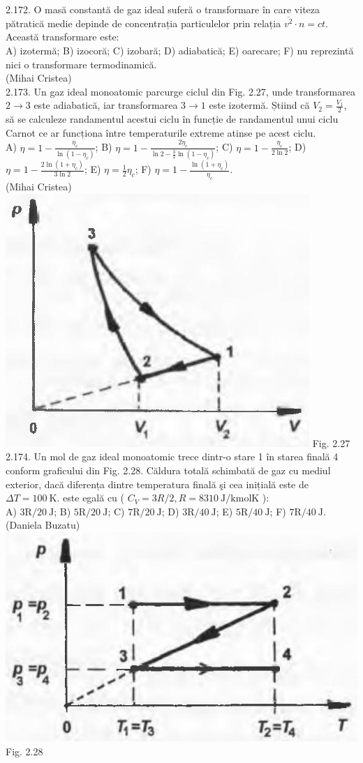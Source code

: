 2.172. O masă constantă de gaz ideal suferă o transformare în care viteza pătratică medie depinde de concentrația particulelor prin relația $\overline{v^{2}} \cdot n=c t$. Această transformare este:\\ A) izotermă; B) izocoră; C) izobară; D) adiabatică; E) oarecare; F) nu reprezintă nici o transformare termodinamică.\\ (Mihai Cristea)\\

2.173. Un gaz ideal monoatomic parcurge ciclul din Fig. 2.27, unde transformarea $2 \rightarrow 3$ este adiabatică, iar transformarea $3 \rightarrow 1$ este izotermă. Știind că $V_{2}=\frac{V_{1}}{2}$, să se calculeze randamentul acestui ciclu în funcție de randamentul unui ciclu Carnot ce ar funcționa între temperaturile extreme atinse pe acest ciclu.\\ A) $\eta=1-\frac{\eta_{c}}{\ln \left(1-\eta_{c}\right)}$; B) $\eta=1-\frac{2 \eta_{c}}{\ln 2-\frac{3}{2} \ln \left(1-\eta_{c}\right)}$; C) $\eta=1-\frac{\eta_{c}}{2 \ln 2}$; D) $\eta=1-\frac{2 \ln \left(1+\eta_{c}\right)}{3 \ln 2}$; E) $\eta=\frac{1}{2} \eta_{c}$; F) $\eta=1-\frac{\ln \left(1+\eta_{c}\right)}{\eta_{c}}$.\\ (Mihai Cristea)\\ \includegraphics[width=0.4\linewidth]{images/2025_07_01_5b3ff9fa0d508c8e9f17g-112} Fig. 2.27\\

2.174. Un mol de gaz ideal monoatomic trece dintr-o stare 1 în starea finală 4 conform graficului din Fig. 2.28. Căldura totală schimbată de gaz cu mediul exterior, dacă diferența dintre temperatura finală şi cea inițială este de $\Delta T=100 \mathrm{~K}$. este egală cu ( $C_{V}=3 R / 2, R=8310 \mathrm{~J} / \mathrm{kmol} \mathrm{K}$ ):\\ A) $3 \mathrm{R} / 20 \mathrm{~J}$; B) $5 \mathrm{R} / 20 \mathrm{~J}$; C) $7 \mathrm{R} / 20 \mathrm{~J}$; D) $3 \mathrm{R} / 40 \mathrm{~J}$; E) $5 \mathrm{R} / 40 \mathrm{~J}$; F) $7 \mathrm{R} / 40 \mathrm{~J}$.\\ (Daniela Buzatu)\\ \includegraphics[width=0.4\linewidth]{images/2025_07_01_5b3ff9fa0d508c8e9f17g-113(1)} Fig. 2.28\\

